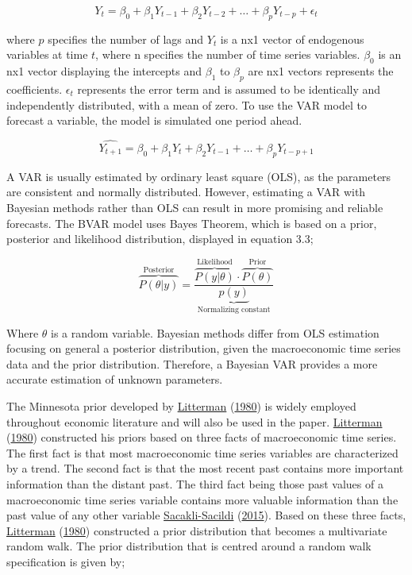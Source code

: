 \documentclass[11pt,preprint, authoryear]{elsarticle}
\numberwithin{equation}{section}
\numberwithin{figure}{section}
\numberwithin{table}{section}
\begin{document}
\begin{equation}
Y_{t} = \beta_0 + \beta_1 Y_{t-1} + \beta_2 Y_{t-2} + … + \beta_p Y_{t-p} + \epsilon_t 
\end{equation}

where \(p\) specifies the number of lags and \(Y_t\) is a nx1 vector of
endogenous variables at time \(t\), where n specifies the number of time
series variables. \(\beta_0\) is an nx1 vector displaying the intercepts
and \(\beta_{1}\) to \(\beta_p\) are nx1 vectors represents the
coefficients. \(\epsilon_t\) represents the error term and is assumed to
be identically and independently distributed, with a mean of zero. To
use the VAR model to forecast a variable, the model is simulated one
period ahead.

\begin{equation}
\hat{Y_{t+1}} = \beta_0 + \beta_1 Y_{t} + \beta_2 Y_{t-1} + … + \beta_p Y_{t-p+1}
\end{equation}

A VAR is usually estimated by ordinary least square (OLS), as the
parameters are consistent and normally distributed. However, estimating
a VAR with Bayesian methods rather than OLS can result in more promising
and reliable forecasts. The BVAR model uses Bayes Theorem, which is
based on a prior, posterior and likelihood distribution, displayed in
equation 3.3;

\begin{equation}
\overbrace{P(\theta|y)}^{\text{Posterior}} = \frac{\overbrace{P(y|\theta)}^{\text{Likelihood}} \cdot \overbrace{P(\theta)}^{\text{Prior}}}{\underbrace{p(y)}_{\text{Normalizing constant}}}
\end{equation}

Where \(\theta\) is a random variable. Bayesian methods differ from OLS
estimation focusing on general a posterior distribution, given the
macroeconomic time series data and the prior distribution. Therefore, a
Bayesian VAR provides a more accurate estimation of unknown parameters.

The Minnesota prior developed by
\protect\hyperlink{ref-litter}{Litterman}
(\protect\hyperlink{ref-litter}{1980}) is widely employed throughout
economic literature and will also be used in the paper.
\protect\hyperlink{ref-litter}{Litterman}
(\protect\hyperlink{ref-litter}{1980}) constructed his priors based on
three facts of macroeconomic time series. The first fact is that most
macroeconomic time series variables are characterized by a trend. The
second fact is that the most recent past contains more important
information than the distant past. The third fact being those past
values of a macroeconomic time series variable contains more valuable
information than the past value of any other variable
\protect\hyperlink{ref-sacak}{Sacakli-Sacildi}
(\protect\hyperlink{ref-sacak}{2015}). Based on these three facts,
\protect\hyperlink{ref-litter}{Litterman}
(\protect\hyperlink{ref-litter}{1980}) constructed a prior distribution
that becomes a multivariate random walk. The prior distribution that is
centred around a random walk specification is given by;
\end{document}
